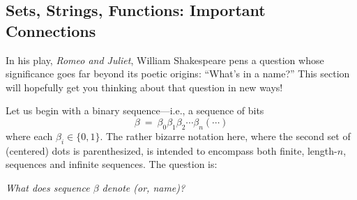 \subsection{Sets, Strings, Functions: Important Connections}
\label{sec:sets-strings-functions}

In his play, {\it Romeo and Juliet}, William Shakespeare pens a question whose significance goes far beyond its poetic origins: ``What's in a name?''  This section will hopefully get you thinking about that question in new ways!

Let us begin with a binary sequence---i.e., a sequence of bits
\[ \beta \ = \ \beta_0 \beta_1 \beta_2 \cdots \beta_n (\cdots) \]
where each $\beta_i \in \{0,1\}$.  The rather bizarre notation here, where the second set of (centered) dots is parenthesized, is intended to encompass both finite, length-$n$, sequences and infinite sequences.  The question is:

\smallskip

{\em What does sequence $\beta$ denote (or, name)?}

\smallskip

